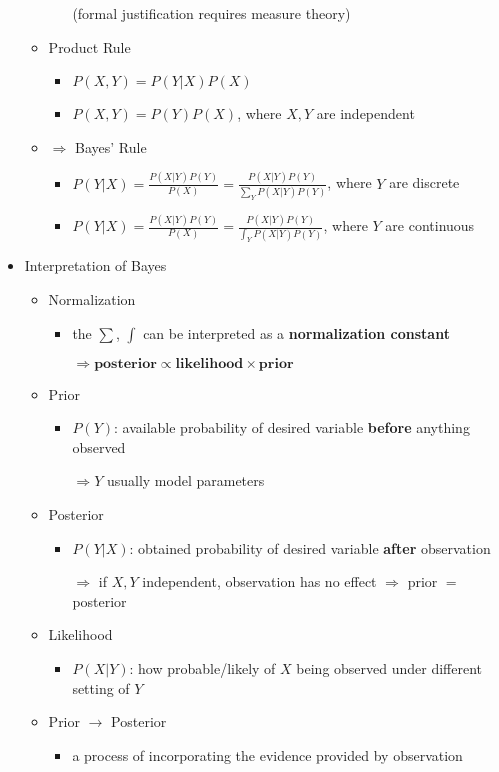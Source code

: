 \begin{itemize}
\begin{itemize}
\begin{itemize}
		(formal justification requires measure theory)
		\end{itemize}
	\item Product Rule
		\begin{itemize}
		\item $P(X, Y) = P(Y|X)P(X)$
		\item $P(X, Y) = P(Y)P(X)$, where $X,Y$ are independent
		\end{itemize}
	\item $\Rightarrow$ Bayes' Rule
		\begin{itemize}
		\item $\displaystyle P(Y|X) = \frac {P(X|Y)P(Y)} {P(X)} = \frac{P(X|Y)P(Y)}{\sum_YP(X|Y)P(Y)}$, where $Y$ are discrete
		\item $\displaystyle P(Y|X) = \frac {P(X|Y)P(Y)} {P(X)} = \frac{P(X|Y)P(Y)}{\int_YP(X|Y)P(Y)}$, where $Y$ are continuous
		\end{itemize}
	\end{itemize}
\item Interpretation of Bayes
	\begin{itemize}
	\item Normalization
		\begin{itemize}
		\item the $\sum$, $\int$ can be interpreted as a \textbf{normalization constant}
		
		$\Rightarrow \textbf{posterior} \propto \textbf{likelihood} \times \textbf{prior}$
		\end{itemize}
	\item Prior
		\begin{itemize}
		\item $P(Y)$: available probability of desired variable \textbf{before} anything observed
		
		$\Rightarrow Y$ usually model parameters
		\end{itemize}
	\item Posterior
		\begin{itemize}
		\item $P(Y|X)$: obtained probability of desired variable \textbf{after} observation
		
		$\Rightarrow$ if $X,Y$ independent, observation has no effect $\Rightarrow$ prior $=$ posterior
		\end{itemize}
	\item Likelihood
		\begin{itemize}
		\item $P(X|Y)$: how probable/likely of $X$ being observed under different setting of $Y$
		
		\end{itemize}
	\item Prior $\rightarrow$ Posterior
		\begin{itemize}
		\item a process of incorporating the evidence provided by observation
		\end{itemize}
	\end{itemize}
\end{itemize}
 
